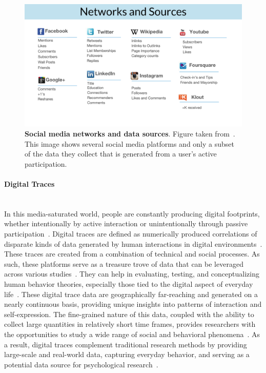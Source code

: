 \documentclass{DESSThesis}
\begin{document}
\begin{figure}[htb!]
	\centering
	\includegraphics[width=0.9\linewidth]{img/Introduction/networks_and_sources.pdf}
	\caption[Social media networks and data sources]{\textbf{Social media networks and data sources}. Figure taken from~\cite{Rao_2016}. This image shows several social media platforms and only a subset of the data they collect that is generated from a user's active participation.}
	\label{fig:networks_and_sources}
\end{figure}

\paragraph{Digital Traces}\mbox{}\\

\noindent In this media-saturated world, people are constantly producing digital footprints, whether intentionally by active interaction or unintentionally through passive participation~\cite{doi:10.1177/20539517231213827,IJoC8650}. Digital traces are defined as numerically produced correlations of disparate kinds of data generated by human interactions in digital environments~\cite{IJoC8650}. These traces are created from a combination of technical and social processes. As such, these platforms serve as a treasure trove of data that can be leveraged across various studies~\cite{IndiraSen2021ApplyingAT}. They can help in evaluating, testing, and conceptualizing human behavior theories, especially those tied to the digital aspect of everyday life~\cite{IndiraSen2021ApplyingAT}. These digital trace data are geographically far-reaching and generated on a nearly continuous basis, providing unique insights into patterns of interaction and self-expression. The fine-grained nature of this data, coupled with the ability to collect large quantities in relatively short time frames, provides researchers with the opportunities to study a wide range of social and behavioral phenomena~\cite{Cesare_Lee_McCormick_Spiro_Zagheni_2018,Keusch_Kreuter_2021}. As a result, digital traces complement traditional research methods by providing large-scale and real-world data, capturing everyday behavior, and serving as a potential data source for psychological research~\cite{doi:10.1177/0963721419861410}.
\end{document}
